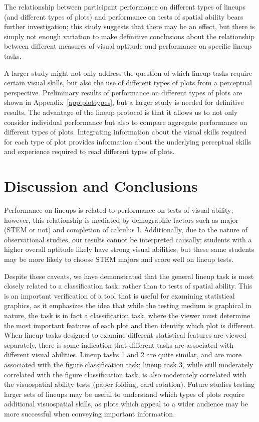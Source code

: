 \documentclass[journal]{vgtc}\usepackage[]{graphicx}\usepackage[]{color}
\begin{document}
The relationship between participant performance on different types of lineups (and different types of plots) and performance on tests of spatial ability bears further investigation; this study suggests that there may be an effect, but there is simply not enough variation to make definitive conclusions about the relationship between different measures of visual aptitude and performance on specific lineup tasks. 

A larger study might not only address the question of which lineup tasks require certain visual skills, but also the use of different types of plots from a perceptual perspective. Preliminary results of performance on different types of plots are shown in Appendix~\ref{app:plottypes}, but a larger study is needed for definitive results. The advantage of the lineup protocol is that it allows us to not only consider individual performance but also to compare aggregate performance on different types of plots. Integrating information about the visual skills required for each type of plot provides information about the underlying perceptual skills and experience required to read different types of plots.


\section{Discussion and Conclusions}\label{sec:discussion}
Performance on lineups is related to performance on tests of visual ability; however, this relationship is mediated by demographic factors such as major (STEM or not) and completion of calculus I. Additionally, due to the nature of observational studies, our results cannot be interpreted causally; students with a higher overall aptitude likely have strong visual abilities, but these same students may be more likely to choose STEM majors and score well on lineup tests.

Despite these caveats, we have demonstrated that the general lineup task is most closely related to a classification task, rather than to tests of spatial ability.
This is an important verification of a tool that is useful for examining statistical graphics, as it emphasizes the idea that while the testing medium is graphical in nature, the task is in fact a classification task, where the viewer must determine the most important features of each plot and then identify which plot is different.
When lineup tasks designed to examine different statistical features are viewed separately, there is some indication that different tasks are associated with different visual abilities.
Lineup tasks 1 and 2 are quite similar, and are more associated with the figure classification task; lineup task 3, while still moderately correlated with the figure classification task, is also moderately correlated with the visuospatial ability tests (paper folding, card rotation).
Future studies testing larger sets of lineups may be useful to understand which types of plots require additional visuospatial skills, as plots which appeal to a wider audience may be more successful when conveying important information.
\end{document}
